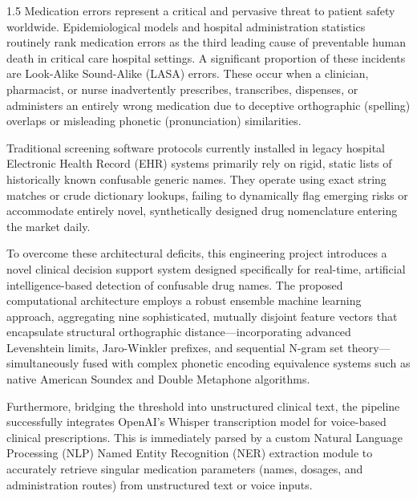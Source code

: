 \documentclass[12pt,a4paper]{report}
\begin{document}
\begin{spacing}{1.5}
Medication errors represent a critical and pervasive threat to patient safety worldwide. Epidemiological models and hospital administration statistics routinely rank medication errors as the third leading cause of preventable human death in critical care hospital settings. A significant proportion of these incidents are Look-Alike Sound-Alike (LASA) errors. These occur when a clinician, pharmacist, or nurse inadvertently prescribes, transcribes, dispenses, or administers an entirely wrong medication due to deceptive orthographic (spelling) overlaps or misleading phonetic (pronunciation) similarities.

Traditional screening software protocols currently installed in legacy hospital Electronic Health Record (EHR) systems primarily rely on rigid, static lists of historically known confusable generic names. They operate using exact string matches or crude dictionary lookups, failing to dynamically flag emerging risks or accommodate entirely novel, synthetically designed drug nomenclature entering the market daily.

To overcome these architectural deficits, this engineering project introduces a novel clinical decision support system designed specifically for real-time, artificial intelligence-based detection of confusable drug names. The proposed computational architecture employs a robust ensemble machine learning approach, aggregating nine sophisticated, mutually disjoint feature vectors that encapsulate structural orthographic distance---incorporating advanced Levenshtein limits, Jaro-Winkler prefixes, and sequential N-gram set theory---simultaneously fused with complex phonetic encoding equivalence systems such as native American Soundex and Double Metaphone algorithms.

Furthermore, bridging the threshold into unstructured clinical text, the pipeline successfully integrates OpenAI's Whisper transcription model for voice-based clinical prescriptions. This is immediately parsed by a custom Natural Language Processing (NLP) Named Entity Recognition (NER) extraction module to accurately retrieve singular medication parameters (names, dosages, and administration routes) from unstructured text or voice inputs.


\end{spacing}
\end{document}
